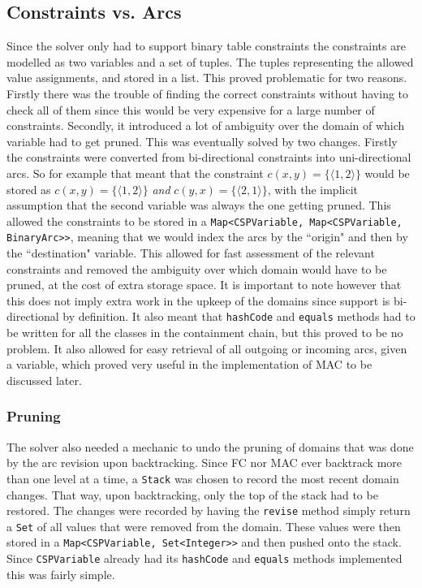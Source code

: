 \documentclass[british]{article}
\newcommand{\code}[1]{\texttt{#1}}
\begin{document}
	\subsection{Constraints vs. Arcs} Since the solver only had to support binary table constraints the constraints are modelled as two variables and a set of tuples. The tuples representing the allowed value assignments, and stored in a list. This proved problematic for two reasons. Firstly there was the trouble of finding the correct constraints without having to check all of them since this would be very expensive for a large number of constraints. Secondly, it introduced a lot of ambiguity over the domain of which variable had to get pruned. This was eventually solved by two changes. Firstly the constraints were converted from bi-directional constraints into uni-directional arcs. So for example that meant that the constraint $c(x,y) = \{\langle1,2\rangle\}$ would be stored as $c(x,y) = \{\langle1,2\rangle\}$ \textit{and} $c(y,x) = \{\langle2,1\rangle\}$, with the implicit assumption that the second variable was always the one getting pruned. This allowed the constraints to be stored in a \code{Map<CSPVariable, Map<CSPVariable, BinaryArc>>}, meaning that we would index the arcs by the ``origin" and then by the ``destination" variable. This allowed for fast assessment of the relevant constraints and removed the ambiguity over which domain would have to be pruned, at the cost of extra storage space. It is important to note however that this does not imply extra work in the upkeep of the domains since support is bi-directional by definition. It also meant that \code{hashCode} and \code{equals} methods had to be written for all the classes in the containment chain, but this proved to be no problem. It also allowed for easy retrieval of all outgoing or incoming arcs, given a variable, which proved very useful in the implementation of MAC to be discussed later. 
	
	\subsubsection{Pruning} The solver also needed a mechanic to undo the pruning of domains that was done by the arc revision upon backtracking. Since FC nor MAC ever backtrack more than one level at a time, a \code{Stack} was chosen to record the most recent domain changes. That way, upon backtracking, only the top of the stack had to be restored. The changes were recorded by having the \code{revise} method simply return a \code{Set} of all values that were removed from the domain. These values were then stored in a \code{Map<CSPVariable, Set<Integer>>}  and then pushed onto the stack. Since \code{CSPVariable} already had its \code{hashCode} and \code{equals} methods implemented this was fairly simple. 
	
\end{document}
